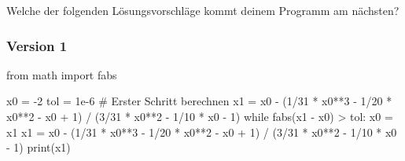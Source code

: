 \documentclass[
  letterpaper,
  DIV=11,
  oneside]{scrreprt}
\newenvironment{Shaded}{\begin{snugshade}}{\end{snugshade}}
\newcommand{\BuiltInTok}[1]{\textcolor[rgb]{0.00,0.23,0.31}{#1}}
\newcommand{\CommentTok}[1]{\textcolor[rgb]{0.37,0.37,0.37}{#1}}
\newcommand{\ControlFlowTok}[1]{\textcolor[rgb]{0.00,0.23,0.31}{#1}}
\newcommand{\DecValTok}[1]{\textcolor[rgb]{0.68,0.00,0.00}{#1}}
\newcommand{\FloatTok}[1]{\textcolor[rgb]{0.68,0.00,0.00}{#1}}
\newcommand{\ImportTok}[1]{\textcolor[rgb]{0.00,0.46,0.62}{#1}}
\newcommand{\NormalTok}[1]{\textcolor[rgb]{0.00,0.23,0.31}{#1}}
\newcommand{\OperatorTok}[1]{\textcolor[rgb]{0.37,0.37,0.37}{#1}}
\theoremstyle{definition}
\theoremstyle{definition}
\theoremstyle{remark}
\begin{document}
\begin{tcolorbox}[enhanced jigsaw, colframe=quarto-callout-tip-color-frame, colback=white, opacityback=0, toptitle=1mm, bottomrule=.15mm, breakable, title=\textcolor{quarto-callout-tip-color}{\faLightbulb}\hspace{0.5em}{Lösung}, toprule=.15mm, colbacktitle=quarto-callout-tip-color!10!white, leftrule=.75mm, titlerule=0mm, coltitle=black, bottomtitle=1mm, arc=.35mm, rightrule=.15mm, left=2mm, opacitybacktitle=0.6]

Welche der folgenden Lösungsvorschläge kommt deinem Programm am
nächsten?

\hypertarget{version-1}{%
\subsubsection{Version 1}\label{version-1}}

\begin{Shaded}
\begin{Highlighting}[]
\ImportTok{from}\NormalTok{ math }\ImportTok{import}\NormalTok{ fabs}

\NormalTok{x0 }\OperatorTok{=} \OperatorTok{{-}}\DecValTok{2}
\NormalTok{tol }\OperatorTok{=} \FloatTok{1e{-}6}
\CommentTok{\# Erster Schritt berechnen}
\NormalTok{x1 }\OperatorTok{=}\NormalTok{ x0 }\OperatorTok{{-}}\NormalTok{ (}\DecValTok{1}\OperatorTok{/}\DecValTok{31} \OperatorTok{*}\NormalTok{ x0}\OperatorTok{**}\DecValTok{3} \OperatorTok{{-}} \DecValTok{1}\OperatorTok{/}\DecValTok{20} \OperatorTok{*}\NormalTok{ x0}\OperatorTok{**}\DecValTok{2} \OperatorTok{{-}}\NormalTok{ x0 }\OperatorTok{+} \DecValTok{1}\NormalTok{) }\OperatorTok{/}\NormalTok{ (}\DecValTok{3}\OperatorTok{/}\DecValTok{31} \OperatorTok{*}\NormalTok{ x0}\OperatorTok{**}\DecValTok{2} \OperatorTok{{-}} \DecValTok{1}\OperatorTok{/}\DecValTok{10} \OperatorTok{*}\NormalTok{ x0 }\OperatorTok{{-}} \DecValTok{1}\NormalTok{)}
\ControlFlowTok{while}\NormalTok{ fabs(x1 }\OperatorTok{{-}}\NormalTok{ x0) }\OperatorTok{\textgreater{}}\NormalTok{ tol:}
\NormalTok{    x0 }\OperatorTok{=}\NormalTok{ x1}
\NormalTok{    x1 }\OperatorTok{=}\NormalTok{ x0 }\OperatorTok{{-}}\NormalTok{ (}\DecValTok{1}\OperatorTok{/}\DecValTok{31} \OperatorTok{*}\NormalTok{ x0}\OperatorTok{**}\DecValTok{3} \OperatorTok{{-}} \DecValTok{1}\OperatorTok{/}\DecValTok{20} \OperatorTok{*}\NormalTok{ x0}\OperatorTok{**}\DecValTok{2} \OperatorTok{{-}}\NormalTok{ x0 }\OperatorTok{+} \DecValTok{1}\NormalTok{) }\OperatorTok{/}\NormalTok{ (}\DecValTok{3}\OperatorTok{/}\DecValTok{31} \OperatorTok{*}\NormalTok{ x0}\OperatorTok{**}\DecValTok{2} \OperatorTok{{-}} \DecValTok{1}\OperatorTok{/}\DecValTok{10} \OperatorTok{*}\NormalTok{ x0 }\OperatorTok{{-}} \DecValTok{1}\NormalTok{)}
\BuiltInTok{print}\NormalTok{(x1)}
\end{Highlighting}
\end{Shaded}


\end{tcolorbox}
\end{document}
